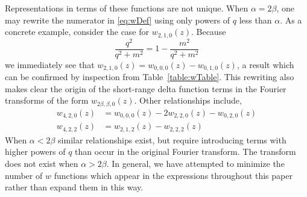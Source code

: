 \documentclass[%
 preprint,
 amsmath,amssymb,
 aps,
]{revtex4-1}
\newcommand{\w}[4]{w_{#1,#2,#3}(#4)}
\begin{document}
Representations in terms of these functions are not unique. When $\alpha=2\beta$, one may rewrite the numerator in \eqref{eq:wDef} using only powers of $q$ less than $\alpha$. As a concrete example, consider the case for $\w{2}{1}{0}{z}$. Because
\begin{equation}
\frac{q^2}{q^2+m^2}=1-\frac{m^2}{q^2+m^2}
\end{equation}
we immediately see that $\w{2}{1}{0}{z}=\w{0}{0}{0}{z}-\w{0}{1}{0}{z}$, a result which can be confirmed by inspection from Table~\ref{table:wTable}. This rewriting also makes clear the origin of the short-range delta function terms in the Fourier transforms of the form $\w{2\beta}{\beta}{0}{z}$. Other relationships include,
\begin{align}
\w{4}{2}{0}{z}&=\w{0}{0}{0}{z}-2 \w{2}{2}{0}{z}-\w{0}{2}{0}{z} \\
\w{4}{2}{2}{z}&=\w{2}{1}{2}{z}-\w{2}{2}{2}{z}
\end{align}
When $\alpha < 2\beta$ similar relationships exist, but require introducing terms with higher powers of $q$ than occur in the original Fourier transform. The transform does not exist when $\alpha>2\beta$. In general, we have attempted to minimize the number of $w$ functions which appear in the expressions throughout this paper rather than expand them in this way.




\end{document}
